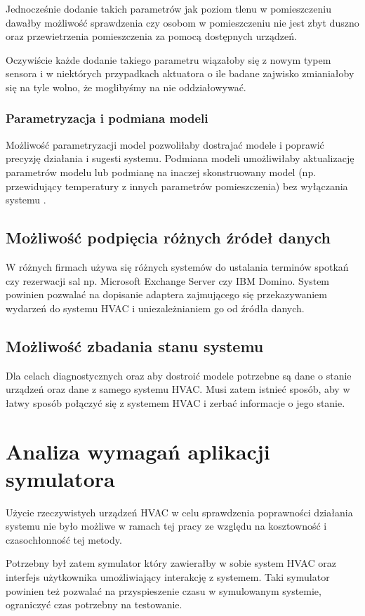 Jednocześnie dodanie takich parametrów jak poziom tlenu w pomieszczeniu dawałby możliwość sprawdzenia czy osobom w pomieszczeniu nie jest zbyt duszno oraz przewietrzenia pomieszczenia za pomocą dostępnych urządzeń.

Oczywiście każde dodanie takiego parametru wiązałoby się z nowym typem sensora i w niektórych przypadkach aktuatora o ile badane zajwisko zmianiałoby się na tyle wolno, że moglibyśmy na nie oddziałowywać.

\subsubsection*{Parametryzacja i podmiana modeli}
Możliwość parametryzacji model pozwoliłaby dostrajać modele i poprawić precyzję działania i sugesti systemu.
Podmiana modeli umożliwiłaby aktualizację parametrów modelu lub podmianę na inaczej skonstruowany model (np. przewidujący temperatury z innych parametrów pomieszczenia) bez wyłączania systemu . 

\subsection*{Możliwość podpięcia różnych źródeł danych}
W różnych firmach używa się różnych systemów do ustalania terminów spotkań czy rezerwacji sal np. Microsoft Exchange Server czy IBM Domino.
System powinien pozwalać na dopisanie adaptera zajmującego się przekazywaniem wydarzeń do systemu HVAC i uniezależnianiem go od źródła danych.

\subsection*{Możliwość zbadania stanu systemu}
Dla celach diagnostycznych oraz aby dostroić modele potrzebne są dane o stanie urządzeń oraz dane z samego systemu HVAC. Musi zatem istnieć sposób, aby w łatwy sposób połączyć się z systemem HVAC i zerbać informacje o jego stanie.

\section{Analiza wymagań aplikacji symulatora}
Użycie rzeczywistych urządzeń HVAC w celu sprawdzenia poprawności działania systemu nie było możliwe w ramach tej pracy ze względu na kosztowność i czasochłonność tej metody. 

Potrzebny był zatem symulator który zawierałby w sobie system HVAC oraz interfejs użytkownika umożliwiający interakcję z systemem. Taki symulator powinien też pozwalać na przyspieszenie czasu w symulowanym systemie, ograniczyć czas potrzebny na testowanie.

